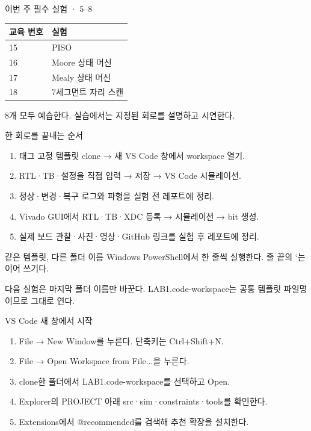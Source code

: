 \begin{frame}{이번 주 필수 실험 · 5–8}
\small
\begin{center}\renewcommand{\arraystretch}{1.55}\begin{tabular}{ll}
교육 번호 & 실험\\\hline
15 & PISO\\
16 & Moore 상태 머신\\
17 & Mealy 상태 머신\\
18 & 7세그먼트 자리 스캔\\
\end{tabular}\end{center}8개 모두 예습한다. 실습에서는 지정된 회로를 설명하고 시연한다.\par
\end{frame}

\begin{frame}[label=start]{한 회로를 끝내는 순서}
\small
\begin{enumerate}
\item 태그 고정 템플릿 clone → 새 VS Code 창에서 workspace 열기.
\item RTL·TB·설정을 직접 입력 → 저장 → VS Code 시뮬레이션.
\item 정상·변경·복구 로그와 파형을 실험 전 레포트에 정리.
\item Vivado GUI에서 RTL·TB·XDC 등록 → 시뮬레이션 → bit 생성.
\item 실제 보드 관찰·사진·영상·GitHub 링크를 실험 후 레포트에 정리.
\end{enumerate}
\end{frame}

\begin{frame}{같은 템플릿, 다른 폴더 이름}
\small
Windows PowerShell에서 한 줄씩 실행한다. 줄 끝의 `는 이어 쓰기다.\par{}다음 실험은 마지막 폴더 이름만 바꾼다. LAB1.code-workspace는 공통 템플릿 파일명이므로 그대로 연다.\par
\end{frame}

\begin{frame}{VS Code 새 창에서 시작}
\small
\begin{enumerate}
\item File → New Window를 누른다. 단축키는 Ctrl+Shift+N.
\item File → Open Workspace from File...을 누른다.
\item clone한 폴더에서 LAB1.code-workspace를 선택하고 Open.
\item Explorer의 PROJECT 아래 src·sim·constraints·tools를 확인한다.
\item Extensions에서 @recommended를 검색해 추천 확장을 설치한다.
\end{enumerate}
\end{frame}

